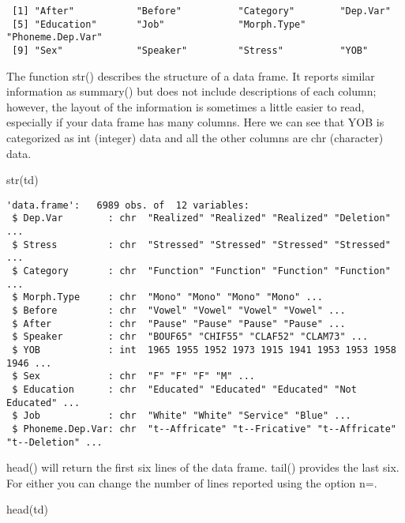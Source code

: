\documentclass[
  10pt,
  letterpaper]{article}
\newenvironment{Shaded}{\begin{snugshade}}{\end{snugshade}}
\newcommand{\FunctionTok}[1]{\textcolor[rgb]{0.28,0.35,0.67}{#1}}
\newcommand{\NormalTok}[1]{\textcolor[rgb]{0.00,0.23,0.31}{#1}}
\renewcommand\texttt[1]{{\ttfamily\color{BrickRed}#1}}
\begin{document}
\begin{verbatim}
 [1] "After"           "Before"          "Category"        "Dep.Var"        
 [5] "Education"       "Job"             "Morph.Type"      "Phoneme.Dep.Var"
 [9] "Sex"             "Speaker"         "Stress"          "YOB"            
\end{verbatim}

The function \texttt{str()} describes the structure of a data frame. It
reports similar information as \texttt{summary()} but does not include
descriptions of each column; however, the layout of the information is
sometimes a little easier to read, especially if your data frame has
many columns. Here we can see that \texttt{YOB} is categorized as
\texttt{int} (integer) data and all the other columns are \texttt{chr}
(character) data.

\begin{Shaded}
\begin{Highlighting}[]
\FunctionTok{str}\NormalTok{(td)}
\end{Highlighting}
\end{Shaded}

\begin{verbatim}
'data.frame':   6989 obs. of  12 variables:
 $ Dep.Var        : chr  "Realized" "Realized" "Realized" "Deletion" ...
 $ Stress         : chr  "Stressed" "Stressed" "Stressed" "Stressed" ...
 $ Category       : chr  "Function" "Function" "Function" "Function" ...
 $ Morph.Type     : chr  "Mono" "Mono" "Mono" "Mono" ...
 $ Before         : chr  "Vowel" "Vowel" "Vowel" "Vowel" ...
 $ After          : chr  "Pause" "Pause" "Pause" "Pause" ...
 $ Speaker        : chr  "BOUF65" "CHIF55" "CLAF52" "CLAM73" ...
 $ YOB            : int  1965 1955 1952 1973 1915 1941 1953 1953 1958 1946 ...
 $ Sex            : chr  "F" "F" "F" "M" ...
 $ Education      : chr  "Educated" "Educated" "Educated" "Not Educated" ...
 $ Job            : chr  "White" "White" "Service" "Blue" ...
 $ Phoneme.Dep.Var: chr  "t--Affricate" "t--Fricative" "t--Affricate" "t--Deletion" ...
\end{verbatim}

\texttt{head()} will return the first six lines of the data frame.
\texttt{tail()} provides the last six. For either you can change the
number of lines reported using the option \texttt{n=}.

\begin{Shaded}
\begin{Highlighting}[]
\FunctionTok{head}\NormalTok{(td)}
\end{Highlighting}
\end{Shaded}
\end{document}
